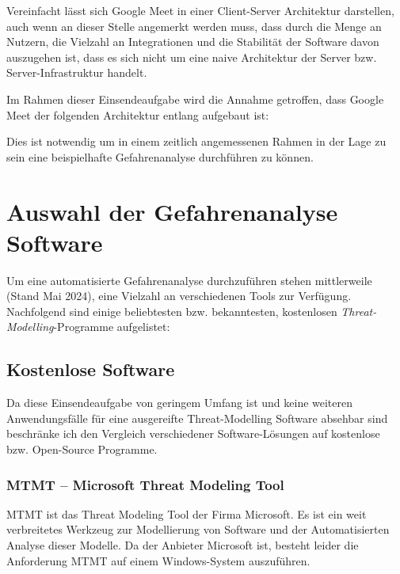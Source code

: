 \documentclass{article}
\begin{document}
Vereinfacht lässt sich Google Meet in einer Client-Server Architektur darstellen, auch 
wenn an dieser Stelle angemerkt werden muss, dass durch die Menge an Nutzern, die Vielzahl 
an Integrationen und die Stabilität der Software davon auszugehen ist, dass es sich nicht 
um eine naive Architektur der Server bzw. Server-Infrastruktur handelt. 

Im Rahmen dieser Einsendeaufgabe wird die Annahme getroffen, dass Google Meet der folgenden Architektur entlang aufgebaut ist:


Dies ist notwendig um in einem zeitlich angemessenen Rahmen in der Lage zu sein eine 
beispielhafte Gefahrenanalyse durchführen zu können.

\section{Auswahl der Gefahrenanalyse Software}

Um eine automatisierte Gefahrenanalyse durchzuführen stehen mittlerweile (Stand Mai 2024), 
eine Vielzahl an verschiedenen Tools zur Verfügung. Nachfolgend sind einige beliebtesten 
bzw. bekanntesten, kostenlosen \textit{Threat-Modelling}-Programme aufgelistet:


\subsection*{Kostenlose Software}

Da diese Einsendeaufgabe von geringem Umfang ist und keine weiteren Anwendungsfälle für 
eine ausgereifte Threat-Modelling Software absehbar sind beschränke ich den Vergleich 
verschiedener Software-Lösungen auf kostenlose bzw. Open-Source Programme.

\subsubsection*{MTMT – Microsoft Threat Modeling Tool}

MTMT ist das Threat Modeling Tool der Firma Microsoft. Es ist ein weit verbreitetes 
Werkzeug zur Modellierung von Software und der Automatisierten Analyse dieser Modelle. Da 
der Anbieter Microsoft ist, besteht leider die Anforderung MTMT auf einem Windows-System 
auszuführen.
\end{document}
